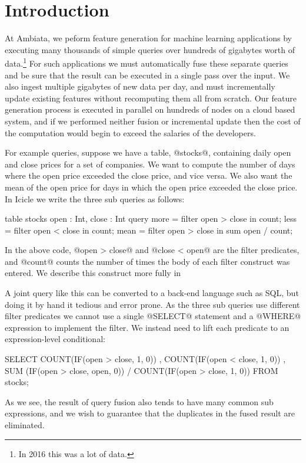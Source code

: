 \section{Introduction}
\label{s:Introduction}

At Ambiata, we peform feature generation for machine learning applications by executing many thousands of simple queries over hundreds of gigabytes worth of data.\footnote{In 2016 this was a lot of data.} For such applications we must automatically fuse these separate queries and be sure that the result can be executed in a single pass over the input. We also ingest multiple gigabytes of new data per day, and must incrementally update existing features without recomputing them all from scratch. Our feature generation process is executed in parallel on hundreds of nodes on a cloud based system, and if we performed neither fusion or incremental update then the cost of the computation would begin to exceed the salaries of the developers.

For example queries, suppose we have a table, @stocks@, containing daily open and close prices for a set of companies. We want to compute the number of days where the open price exceeded the close price, and vice versa. We also want the mean of the open price for days in which the open price exceeded the close price. In Icicle we write the three sub queries as follows:

\begin{code}
table stocks { open : Int, close : Int }
query 
  more  = filter open > close in count;
  less  = filter open < close in count;
  mean  = filter open > close in sum open / count;
\end{code}
In the above code, @open > close@ and @close < open@ are the filter predicates, and @count@ counts the number of times the body of each filter construct was entered. We describe this construct more fully in \REF

A joint query like this can be converted to a back-end language such as SQL, but doing it by hand it tedious and error prone. As the three sub queries use different filter predicates we cannot use a single @SELECT@ statement and a @WHERE@ expression to implement the filter. We instead need to lift each predicate to an expression-level conditional:
\begin{code}
  SELECT COUNT(IF(open > close, 1, 0))
       , COUNT(IF(open < close, 1, 0))
       , SUM  (IF(open > close, open, 0))
       / COUNT(IF(open > close, 1, 0))
  FROM stocks;
\end{code}
As we see, the result of query fusion also tends to have many common sub expressions, and we wish to guarantee that the duplicates in the fused result are eliminated.

